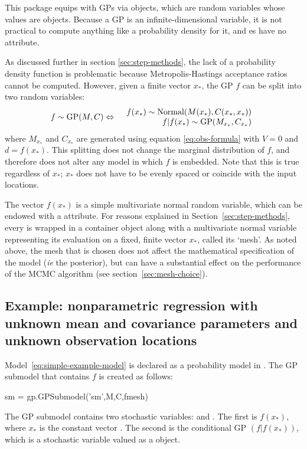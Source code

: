 \documentclass[article]{jss}
\begin{document}
This package equips  with GPs via  objects, which are random variables whose values are  objects. Because a GP is an infinite-dimensional variable, it is not practical to compute anything like a probability density for it, and es have no  attribute.

As discussed further in section \ref{sec:step-methods}, the lack of a probability density function is problematic because Metropolis-Hastings acceptance ratios cannot be computed. However, given a finite vector $x_*$, the GP $f$ can be split into two random variables:
\begin{eqnarray*}
    f\sim\textup{GP}(M,C) & \Leftrightarrow & \begin{array}{r}
        f(x_*)\sim\textup{Normal}(M(x_*), C(x_*,x_*))\\
        f|f(x_*)\sim\textup{GP}(M_{x_*}, C_{x_*})
    \end{array}
\end{eqnarray*}
where $M_{x_*}$ and $C_{x_*}$ are generated using equation \ref{eq:obs-formula} with $V=0$ and $d=f(x_*)$. This splitting does not change the marginal distribution of $f$, and therefore does not alter any model in which $f$ is embedded. Note that this is true regardless of $x_*$; $x_*$ does not have to be evenly spaced or coincide with the input locations.

The vector $f(x_*)$ is a simple multivariate normal random variable, which can be endowed with a  attribute. For reasons explained in Section~\ref{sec:step-methods}, every  is wrapped in a  container object along with a multivariate normal variable representing its evaluation on a fixed, finite vector $x_*$, called its `mesh'. As noted above, the mesh that is chosen does not affect the mathematical specification of the model (\emph{ie} the posterior), but can have a substantial effect on the performance of the MCMC algorithm (see section~\ref{sec:mesh-choice}).  

\subsection{Example: nonparametric regression with unknown mean and covariance parameters and unknown observation locations}\label{sub:BasicMCMC}

Model~\ref{eq:simple-example-model} is declared as a  probability model in . The GP submodel that contains $f$ is created as follows:
\begin{CodeChunk}
\begin{CodeInput}
sm = gp.GPSubmodel('sm',M,C,fmesh)
\end{CodeInput}
\end{CodeChunk}
The GP submodel contains two stochastic variables:  and . The first is $f(x_*)$, where $x_*$ is the constant vector . The second is the conditional GP $(f|f(x_*))$, which is a stochastic variable valued as a  object. 
\end{document}

